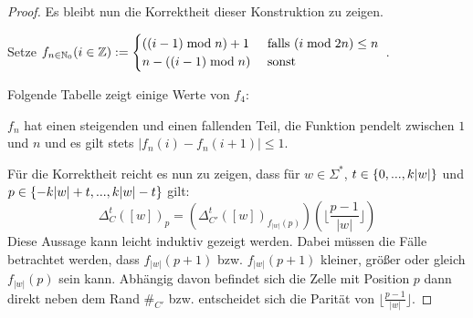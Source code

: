 \begin{proof}
    Es bleibt nun die Korrektheit dieser Konstruktion zu zeigen.
    
    Setze $f_{n \in \mathbb{N}_0}(i \in \mathbb{Z}) :=
    \begin{cases} 
        ((i - 1) \; \mathrm{mod} \; n) + 1  & \textrm{ falls } (i \; \mathrm{mod} \; 2n) \leq n \\
        n - ((i - 1) \; \mathrm{mod} \; n)  & \textrm{ sonst}
    \end{cases}$
    .
    \newline
    
    Folgende Tabelle zeigt einige Werte von $f_4$:
    \begin{center}
    \end{center}
    
    $f_n$ hat einen steigenden und einen fallenden Teil, die Funktion pendelt zwischen $1$ und $n$
    und es gilt stets $|f_n(i) - f_n(i+1)| \leq 1$.
    
    Für die Korrektheit reicht es nun zu zeigen, dass für $w \in \Sigma^*$, $t \in \{ {0, ..., k|w|} \}$ und $p \in \{ {-k|w|+t, ..., k|w|-t} \}$ gilt:
    \[
        \Delta_C^t([w])_p
            = (\Delta_{C'}^t([w])_{f_{|w|}(p)})(\lfloor \frac{p - 1}{|w|} \rfloor)
    \]
    Diese Aussage kann leicht induktiv gezeigt werden.
    Dabei müssen die Fälle betrachtet werden,
    dass $f_{|w|}(p+1)$ \acs{bzw.} $f_{|w|}(p+1)$
    kleiner, größer oder gleich $f_{|w|}(p)$ sein kann.
    Abhängig davon befindet sich die Zelle mit Position $p$ dann direkt neben dem Rand $\#_{C'}$ \acs{bzw.}
    entscheidet sich die Parität von $\lfloor \frac{p - 1}{|w|} \rfloor$.
    
    \begin{comment}
    $P_{t \in \Nz, n \in \N} := \finset{-kn+t, ..., kn-t}$.
    
        Sei $w \in \Sigma^*$.
        Beweis der Behauptung durch Induktion über $t$.

        Sei $t = 0$, $p \in \finset{1, ..., |w|}$.
        Dann $\Delta_{C'}^0([w])_p = w_p
        = \phi(w_p)(0)
        = (\Delta_{C'}^t([w])_{p})(0)
        = (\Delta_{C'}^t([w])_{f_{|w|}(p)})(\lfloor \frac{p - 1}{|w|} \rfloor)$.
        Sei nun $p \in P_{0,|w|} \setminus \finset{1, ..., |w|}$.
        Dann $\lfloor \frac{p - 1}{|w|} \rfloor \in K \setminus \finset{0}$ und
        $\Delta_{C'}^0([w])_p = \#_C =
        (\Delta_{C'}^t([w])_{f_{|w|}(p)})(\lfloor \frac{p - 1}{|w|} \rfloor)$.
    
    
        Sei $1 \leq t \leq k|w|$.
        Dann gilt das auch, ist aber mühselig. Am liebsten
        würde ich ja einen formalen, Computer-gestützten Beweis führen...
    \end{comment}
\end{proof}

